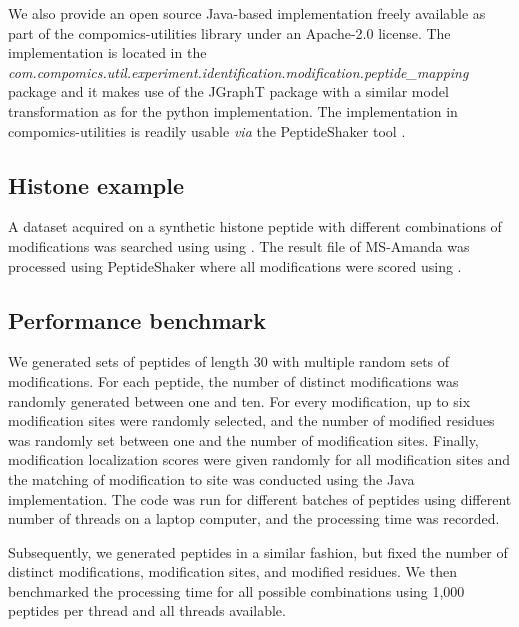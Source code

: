 \documentclass[]{article}
\begin{document}
We also provide an open source Java-based implementation freely available as part of the compomics-utilities library \cite{compomics} under an Apache-2.0 license. The implementation is located in the \textit{com.compomics.util.experiment.identification.modification.peptide\_mapping} package and it makes use of the JGraphT package \cite{JGraphT} with a similar model transformation as  for the python implementation. The implementation in compomics-utilities is readily usable \textit{via} the PeptideShaker tool \cite{PeptideShaker}. 


\subsection{Histone example}

A dataset acquired on a synthetic histone peptide with different combinations of modifications was searched using  using . The result file of MS-Amanda was processed using PeptideShaker where all modifications were scored using .


\subsection{Performance benchmark}

We generated sets of peptides of length 30 with multiple random sets of modifications. For each peptide, the number of distinct modifications was randomly generated between one and ten. For every modification, up to six modification sites were randomly selected, and the number of modified residues was randomly set between one and the number of modification sites. Finally, modification localization scores were given randomly for all modification sites and the matching of modification to site was conducted using the Java implementation. The code was run for different batches of peptides using different number of threads on a laptop computer, and the processing time was recorded. 

Subsequently, we generated peptides in a similar fashion, but fixed the number of distinct modifications, modification sites, and modified residues. We then benchmarked the processing time for all possible combinations using 1,000 peptides per thread and all threads available.
\end{document}

